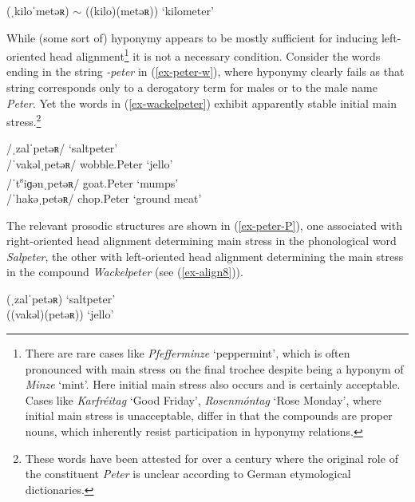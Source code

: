 \documentclass[output=paper
 ,nobabel
 ,draftmode
 ,colorlinks, citecolor=brown
]{langscibook}
\begin{document}
\ex\label{ex-pumpernickel-P}
(ˌkiloˈmetəʀ) $\sim$ ((kilo)(metəʀ))  `kilometer'   \\ 

\zl

\noindent
While (some sort of) hyponymy appears to be mostly sufficient for inducing left-oriented head alignment\footnote{There are rare cases like \emph{Pfefferminze} `peppermint', which is often pronounced with main stress on the final trochee despite being a hyponym of \emph{Minze} `mint'. Here initial main stress also occurs and is certainly acceptable. Cases like \emph{Karfréitag} `Good Friday', \emph{Rosenmóntag} `Rose Monday', where initial main stress is unacceptable, differ in that the compounds are proper nouns, which inherently resist participation in hyponymy relations.} it is not a necessary condition. Consider the words ending in the string \emph{-peter} in (\ref{ex-peter-w}), where hyponymy clearly fails as that string corresponds only to a derogatory term for males or to the male name \emph{Peter}. Yet the words in (\ref{ex-wackelpeter}) exhibit apparently stable initial main stress.\footnote{These words have been attested for over a century where the original role of the constituent \emph{Peter} is unclear according to German etymological dictionaries.}


\eal\label{ex-peter-w}

\ex\label{ex-salpeter}
/ˌzalˈpetəʀ/  `saltpeter'  \\ 

\ex\label{ex-wackelpeter}
/ˈvakəlˌpetəʀ/  wobble.Peter `jello' \\
/ˈt\textsuperscript{s}iɡənˌpetəʀ/  goat.Peter `mumps' \\
/ˈhakəˌpetəʀ/  chop.Peter `ground meat' \\

\zl

\noindent
The relevant prosodic structures are shown in (\ref{ex-peter-P}), one associated with right-oriented
head alignment determining main stress in the phonological word \emph{Salpeter}, the other with
left-oriented head alignment determining the main stress in the compound \emph{Wackelpeter} (see (\ref{ex-align8})).  



\eal\label{ex-peter-P}
\ex\label{ex-salpeter-P}
(ˌzalˈpetəʀ)  `saltpeter'   \\ 
\ex\label{ex-wackelpeter-P} 
((vakəl)(petəʀ))  `jello' \\ 
\end{document}
